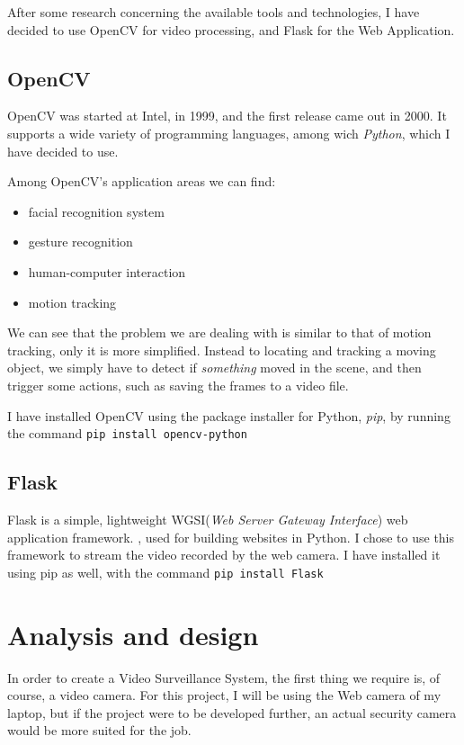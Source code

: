 \documentclass[a4paper,12pt]{report}
\begin{document}
After some research concerning the available tools and technologies, I have decided to use OpenCV for video processing, and Flask for the Web Application.

\section{OpenCV}
OpenCV was started at Intel, in 1999, and the first release came out in 2000. It supports a wide variety of programming languages, among wich \textit{Python}, which I have decided to use.\cite{wiki01}

Among OpenCV's application areas we can find:\cite{wiki02}

\begin{itemize}
\item facial recognition system
\item gesture recognition
\item human-computer interaction
\item motion tracking
\end{itemize}

We can see that the problem we are dealing with is similar to that of motion tracking, only it is more simplified. Instead to locating and tracking a moving object, we simply have to detect if \textit{something} moved in the scene, and then trigger some actions, such as saving the frames to a video file.

I have installed OpenCV using the package installer for Python, \textit{pip}, by running the command \texttt{pip install opencv-python}

\section{Flask}

Flask is a simple, lightweight WGSI(\textit{Web Server Gateway Interface}) web application framework. \cite{wiki03}, used for building websites in Python. I chose to use this framework to stream the video recorded by the web camera. I have installed it using pip as well, with the command \texttt{pip install Flask}


\chapter{Analysis and design}

In order to create a Video Surveillance System, the first thing we require is, of course, a video camera. For this project, I will be using the Web camera of my laptop, but if the project were to be developed further, an actual security camera would be more suited for the job.
\end{document}
